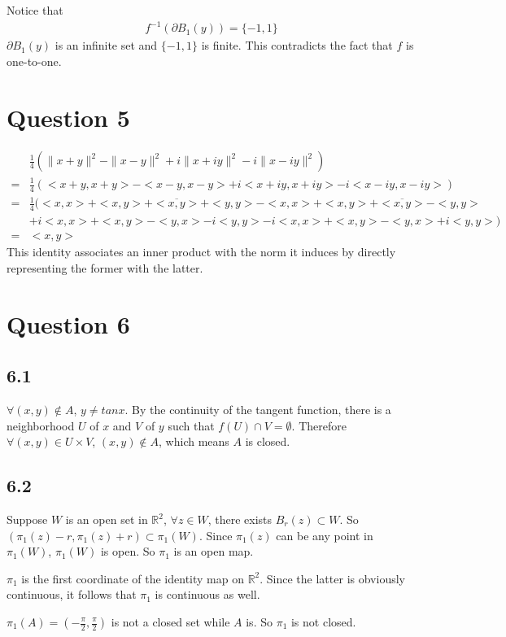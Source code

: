 \documentclass{article}
\begin{document}
Notice that 
\begin{align*}
	f^{-1}(\partial B_1(y) )=\{-1,1\}
\end{align*}
$\partial B_1(y)$ is an infinite set and $\{-1,1\}$ is finite. This contradicts the fact that $f$ is one-to-one.


\section*{Question 5}
\begin{align*}
	&\frac{1}{4}(\|x+y\|^2-\|x-y\|^2+i\|x+iy\|^2-i\|x-iy\|^2 ) \\
	=&\frac{1}{4}(<x+y,x+y>-<x-y,x-y>+i<x+iy,x+iy>-i<x-iy,x-iy> ) \\
	=&\frac{1}{4}(<x,x>+<x,y>+\overline{<x,y>} +<y,y>-<x,x>+<x,y>+\overline{<x,y>}-<y,y> \\
	&+i<x,x>+<x,y>-<y,x>-i<y,y>-i<x,x>+<x,y>-<y,x>+i<y,y>) \\
	=&<x,y>
\end{align*}
This identity associates an inner product with the norm it induces by directly representing the former with the latter.


\section*{Question 6}
\subsection*{6.1}
$\forall (x,y)\notin A$, $y\neq tanx$. By the continuity of the tangent function, there is a neighborhood $U$ of $x$ and $V$ of $y$ such that $f(U)\cap V=\emptyset$. Therefore $\forall (x,y)\in U\times V$, $(x,y)\notin A$, which means $A$ is closed.

\subsection*{6.2}
Suppose $W$ is an open set in $\mathbb{R}^2$, $\forall z\in W$, there exists $B_{r}(z)\subset W$. So $(\pi_1(z)-r,\pi_1(z)+r)\subset \pi_1(W)$. Since $\pi_1(z)$ can be any point in $\pi_1(W)$, $\pi_1(W)$ is open. So $\pi_1$ is an open map.

$\pi_1$ is the first coordinate of the identity map on $\mathbb{R}^2$. Since the latter is obviously continuous, it follows that $\pi_1$ is continuous as well.

$\pi_1(A)=(-\frac{\pi}{2},\frac{\pi}{2} )$ is not a closed set while $A$ is. So $\pi_1$ is not closed.
\end{document}
